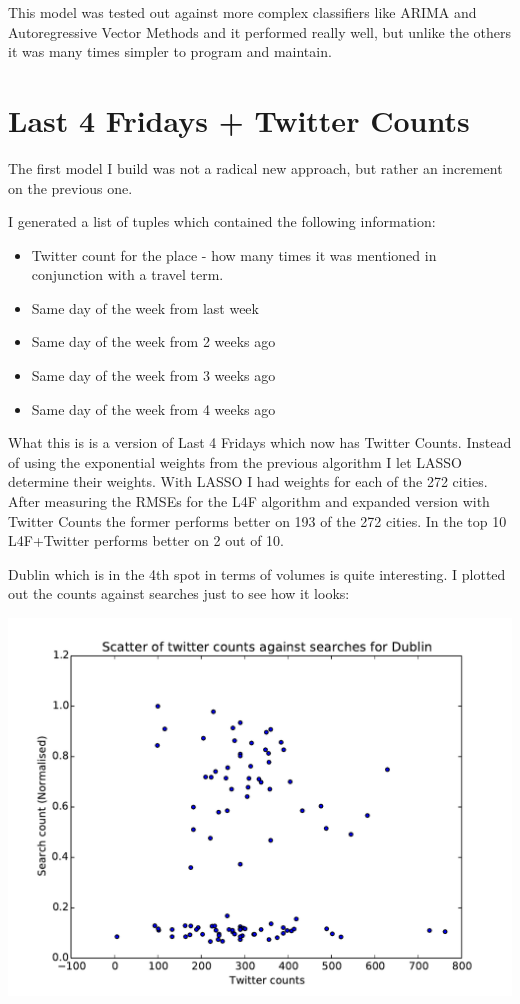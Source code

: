 \documentclass[minf,frontabs,twoside,singlespacing,parskip]{infthesis} %
\begin{document}
This model was tested out against more complex classifiers like ARIMA and Autoregressive Vector Methods and it performed really well, but unlike the others it was many times simpler to program and maintain.

\section{Last 4 Fridays + Twitter Counts}

The first model I build was not a radical new approach, but rather an increment on the previous one.

I generated a list of tuples which contained the following information:
\begin{itemize}
\item Twitter count for the place - how many times it was mentioned in conjunction with a travel term.
\item Same day of the week from last week
\item Same day of the week from 2 weeks ago
\item Same day of the week from 3 weeks ago
\item Same day of the week from 4 weeks ago
\end{itemize}

What this is is a version of Last 4 Fridays which now has Twitter Counts. Instead of using the exponential weights from the previous algorithm I let LASSO determine their weights.
With LASSO I had weights for each of the 272 cities. After measuring the RMSEs for the L4F algorithm and expanded version with Twitter Counts the former performs better on 193 of the 272 cities. In the top 10 L4F+Twitter performs better on 2 out of 10. 

Dublin which is in the 4th spot in terms of volumes is quite interesting. I plotted out the counts against searches just to see how it looks:

\includegraphics[width=\textwidth]{Dublin}  
\end{document}
